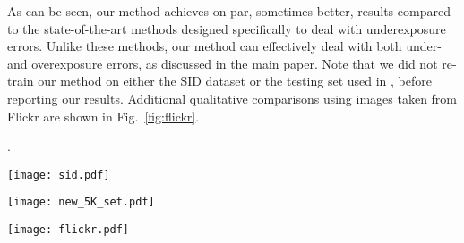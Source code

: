 \documentclass[final]{cvpr}
\begin{document}
As can be seen, our method achieves on par, sometimes better, results compared to the state-of-the-art methods designed specifically to deal with underexposure errors. Unlike these methods, our method can effectively deal with both under- and overexposure errors, as discussed in the main paper. Note that we did not re-train our method on either the SID dataset or the testing set used in \cite{DeepUPE}, before reporting our results.  Additional qualitative comparisons using images taken from Flickr are shown in Fig.\ \ref{fig:flickr}.



\begin{table}[]
\caption{Comparison with other methods for low-light image enhancement using the test set used in \cite{DeepUPE}. \label{table:new_test_set}}.
\centering
{}
\end{table}



\begin{figure*}
\centering
\texttt{[image: sid.pdf]}
\vspace{-2mm}
\caption{Qualitative example from the SID dataset \cite{chen2018learning}. We compare our result with the recent Zero-DCE method \cite{guo2020zero}. \vspace{-2mm}}
\label{fig:sid}
\end{figure*}

\begin{figure*}[t]
\centering
\texttt{[image: new\_5K\_set.pdf]}
\vspace{-2mm}
\caption{Qualitative comparison with the recent Zero-DCE method \cite{guo2020zero} on the testing set, used in \cite{DPE}.}
\label{fig:comparisons_with_zero_dce}
\end{figure*}




\begin{figure*}
\centering
\texttt{[image: flickr.pdf]}
\vspace{-2mm}
\caption{Comparison with the recent Zero-DCE method \cite{guo2020zero} using images taken from Flickr. \vspace{-2mm}}
\label{fig:flickr}
\end{figure*}
\end{document}
